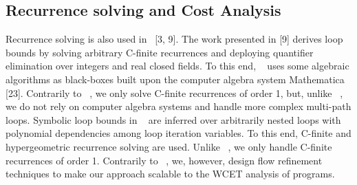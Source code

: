 \subsection{Recurrence solving and Cost Analysis} 
Recurrence solving is also used in~\cite{10.1007/978-3-642-17511-4_7,Henzinger:2008:VVT:1484209.1484240} [3, 9]. The work presented in [9] derives loop bounds by solving arbitrary C-ﬁnite recurrences and deploying quantiﬁer elimination over integers and real closed ﬁelds. To this end, ~\cite{Henzinger:2008:VVT:1484209.1484240} uses some algebraic algorithms as black-boxes built upon the computer algebra system Mathematica [23]. Contrarily to ~\cite{Henzinger:2008:VVT:1484209.1484240}, we only solve C-ﬁnite recurrences of order 1, but, unlike ~\cite{Henzinger:2008:VVT:1484209.1484240}, we do not rely on computer algebra systems and handle more complex multi-path loops. Symbolic loop bounds in ~\cite{10.1007/978-3-642-17511-4_7} are inferred over arbitrarily nested loops with polynomial dependencies among loop iteration variables. To this end, C-ﬁnite and hypergeometric recurrence solving are used. Unlike ~\cite{10.1007/978-3-642-17511-4_7}, we only handle C-ﬁnite recurrences of order 1. Contrarily to ~\cite{10.1007/978-3-642-17511-4_7}, we, however, design ﬂow reﬁnement techniques to make our approach scalable to the WCET analysis of programs.










